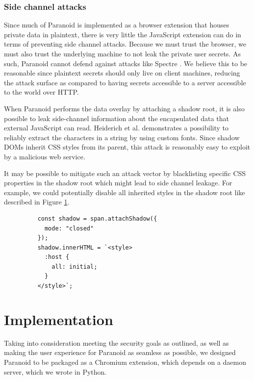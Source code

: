 \documentclass[letterpaper,twocolumn,10pt]{article}
\begin{document}
\subsubsection{Side channel attacks}

Since much of Paranoid is implemented as a browser extension that houses private data in plaintext, there is very little the JavaScript extension can do in terms of preventing side channel attacks. Because we must trust the browser, we must also trust the underlying machine to not leak the private user secrets. As such, Paranoid cannot defend against attacks like Spectre \cite{Kocher2018spectre}. We believe this to be reasonable since plaintext secrets should only live on client machines, reducing the attack surface as compared to having secrets accessible to a server accessible to the world over HTTP.

When Paranoid performs the data overlay by attaching a shadow root, it is also possible to leak side-channel information about the encapsulated data that external JavaScript can read. Heiderich et al. \cite{Heiderich:2012:SAS:2382196.2382276} demonstrates a possibility to reliably extract the characters in a string by using custom fonts. Since shadow DOMs inherit CSS styles from its parent, this attack is reasonably easy to exploit by a malicious web service.

It may be possible to mitigate such an attack vector by blacklisting specific CSS properties in the shadow root which might lead to side channel leakage. For example, we could potentially disable all inherited styles in the shadow root like described in Figure \ref{fig:reset_shadow_inherit}.

\begin{figure}
    \begin{lstlisting}
    const shadow = span.attachShadow({
      mode: "closed"
    });
    shadow.innerHTML = `<style>
      :host {
        all: initial;
      }
    </style>`;
    \end{lstlisting}
    \label{fig:reset_shadow_inherit}
\end{figure}

\section{Implementation}

Taking into consideration meeting the security goals as outlined, as well as making the user experience for Paranoid as seamless as possible, we designed Paranoid to be packaged as a Chromium extension, which depends on a daemon server, which we wrote in Python.
\end{document}
